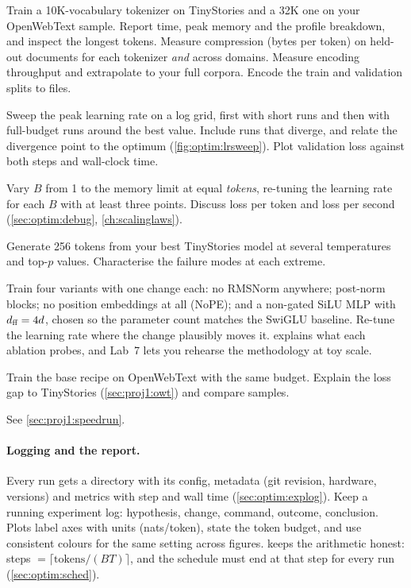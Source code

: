 \begin{description}[leftmargin=1.2em, style=nextline]
  \item[E1: tokenizers.] Train a 10K-vocabulary tokenizer on TinyStories and a 32K one on your
    OpenWebText sample. Report time, peak memory and the profile breakdown, and inspect the longest
    tokens. Measure compression (bytes per token) on held-out documents for each tokenizer
    \emph{and} across domains. Measure encoding throughput and extrapolate to your full corpora.
    Encode the train and validation splits to  files.
  \item[E2: learning rate.] Sweep the peak learning rate on a log grid, first with short runs and
    then with full-budget runs around the best value. Include runs that diverge, and relate the
    divergence point to the optimum (\cref{fig:optim:lrsweep}). Plot validation loss against
    both steps and wall-clock time.
  \item[E3: batch size.] Vary $B$ from 1 to the memory limit at equal \emph{tokens}, re-tuning
    the learning rate for each $B$ with at least three points. Discuss loss per token and loss per
    second (\cref{sec:optim:debug}, \cref{ch:scalinglaws}).
  \item[E4: decoding.] Generate 256 tokens from your best TinyStories model at several
    temperatures and top-$p$ values. Characterise the failure modes at each extreme.
  \item[E5: ablations.] Train four variants with one change each: no RMSNorm anywhere; post-norm
    blocks; no position embeddings at all (NoPE); and a non-gated SiLU MLP with $d_{\text{ff}}=4d$, chosen so
    the parameter count matches the SwiGLU baseline. Re-tune the learning rate where the change
    plausibly moves it.  explains what each ablation probes, and Lab~7 lets you
    rehearse the methodology at toy scale.
  \item[E6: web text.] Train the base recipe on OpenWebText with the same budget. Explain the loss
    gap to TinyStories (\cref{sec:proj1:owt}) and compare samples.
  \item[E7: speed run.] See \cref{sec:proj1:speedrun}.
\end{description}

\paragraph{Logging and the report.} Every run gets a directory with its config, metadata (git
revision, hardware, versions) and metrics with step and wall time (\cref{sec:optim:explog}). Keep a
running experiment log: hypothesis, change, command, outcome, conclusion. Plots label axes with
units (nats/token), state the token budget, and use consistent colours for the same setting across
figures.  keeps the arithmetic honest: steps $=\lceil
\text{tokens}/(BT)\rceil$, and the schedule must end at that step for every run
(\cref{sec:optim:sched}).

